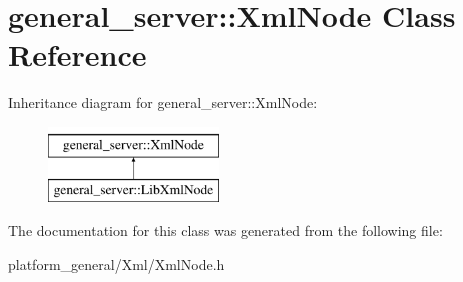 \hypertarget{classgeneral__server_1_1XmlNode}{\section{general\-\_\-server\-:\-:\-Xml\-Node \-Class \-Reference}
\label{classgeneral__server_1_1XmlNode}
}
\-Inheritance diagram for general\-\_\-server\-:\-:\-Xml\-Node\-:\begin{figure}[H]
\begin{center}
\leavevmode
\includegraphics[height=2.000000cm]{classgeneral__server_1_1XmlNode}
\end{center}
\end{figure}


\-The documentation for this class was generated from the following file\-:\begin{DoxyCompactItemize}
\item 
platform\-\_\-general/\-Xml/\-Xml\-Node.\-h\end{DoxyCompactItemize}
